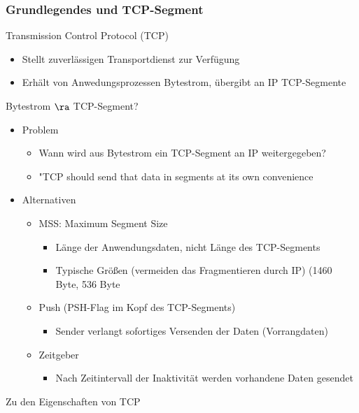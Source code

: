    \subsubsection{Grundlegendes und TCP-Segment}
      Transmission Control Protocol (TCP)
      \begin{itemize}
        \item Stellt zuverlässigen Transportdienst zur Verfügung
        \item Erhält von Anwedungsprozessen Bytestrom, übergibt an IP TCP-Segmente
      \end{itemize}
      Bytestrom $\ra$ TCP-Segment?
      \begin{itemize}
        \item Problem
          \begin{itemize}
            \item Wann wird aus Bytestrom ein TCP-Segment an IP weitergegeben?
            \item "TCP should send that data in segments at its own convenience
          \end{itemize}
        \item Alternativen
          \begin{itemize}
            \item MSS: Maximum Segment Size
              \begin{itemize}
                \item Länge der Anwendungsdaten, nicht Länge des TCP-Segments
                \item Typische Größen (vermeiden das Fragmentieren durch IP) (1460 Byte, 536 Byte
              \end{itemize}
            \item Push (PSH-Flag im Kopf des TCP-Segments)
              \begin{itemize}
                \item Sender verlangt sofortiges Versenden der Daten (Vorrangdaten)
              \end{itemize}
            \item Zeitgeber
              \begin{itemize}
                \item Nach Zeitintervall der Inaktivität werden vorhandene Daten gesendet
              \end{itemize}
          \end{itemize}
      \end{itemize}
      Zu den Eigenschaften von TCP
